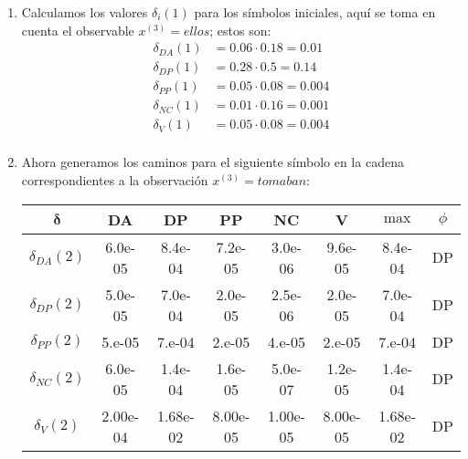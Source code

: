  \begin{enumerate}
     \item Calculamos los valores $\delta_i(1)$ para los símbolos iniciales, aquí se toma en cuenta el observable $x^{(3)} = ellos$; estos son:
     \begin{align*}
         \delta_{DA}(1) &= 0.06 \cdot 0.18 = 0.01\\
         \delta_{DP}(1) &= 0.28 \cdot 0.5 = 0.14 \\
         \delta_{PP}(1) &= 0.05 \cdot 0.08 = 0.004 \\
         \delta_{NC}(1) &= 0.01 \cdot 0.16 = 0.001 \\
         \delta_{V}(1) &= 0.05 \cdot 0.08 = 0.004\\
     \end{align*}

     \item Ahora generamos los caminos para el siguiente símbolo en la cadena correspondientes a la observación $x^{(3)} = tomaban$:
     \begin{center}
        \small
         \begin{tabular}{c c c c c c | c c} \hline
            $\mathbf{\delta}$ & DA & DP & PP & NC & V & $\max$ & $\phi$\\ \hline
            $\delta_{DA}(2)$  & 6.0e-05 & 8.4e-04 & 7.2e-05 & 3.0e-06 & 9.6e-05 & 8.4e-04 & DP\\
            $\delta_{DP}(2)$  & 5.0e-05 & 7.0e-04 & 2.0e-05 & 2.5e-06 & 2.0e-05 & 7.0e-04 & DP \\
            $\delta_{PP}(2)$  & 5.e-05 & 7.e-04 & 2.e-05 & 4.e-05 & 2.e-05 & 7.e-04 & DP \\
            $\delta_{NC}(2)$  & 6.0e-05 &  1.4e-04 & 1.6e-05 & 5.0e-07 & 1.2e-05 & 1.4e-04 & DP \\
            $\delta_{V}(2)$  & 2.00e-04 & 1.68e-02 & 8.00e-05 & 1.00e-05 & 8.00e-05 & 1.68e-02 & DP\\ \hline
         \end{tabular}
     \end{center}


\end{enumerate}
